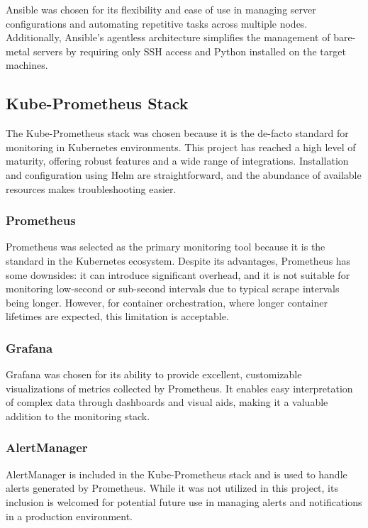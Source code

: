 Ansible was chosen for its flexibility and ease of use in managing server configurations and automating repetitive tasks across multiple nodes. Additionally, Ansible's agentless architecture simplifies the management of bare-metal servers by requiring only SSH access and Python installed on the target machines.

\subsection{Kube-Prometheus Stack}
The Kube-Prometheus stack was chosen because it is the de-facto standard for monitoring in Kubernetes environments. This project has reached a high level of maturity, offering robust features and a wide range of integrations. Installation and configuration using Helm are straightforward, and the abundance of available resources makes troubleshooting easier.

\subsubsection{Prometheus}
Prometheus was selected as the primary monitoring tool because it is the standard in the Kubernetes ecosystem. Despite its advantages, Prometheus has some downsides: it can introduce significant overhead, and it is not suitable for monitoring low-second or sub-second intervals due to typical scrape intervals being longer. However, for container orchestration, where longer container lifetimes are expected, this limitation is acceptable.

\subsubsection{Grafana}
Grafana was chosen for its ability to provide excellent, customizable visualizations of metrics collected by Prometheus. It enables easy interpretation of complex data through dashboards and visual aids, making it a valuable addition to the monitoring stack.

\subsubsection{AlertManager}
AlertManager is included in the Kube-Prometheus stack and is used to handle alerts generated by Prometheus. While it was not utilized in this project, its inclusion is welcomed for potential future use in managing alerts and notifications in a production environment.

